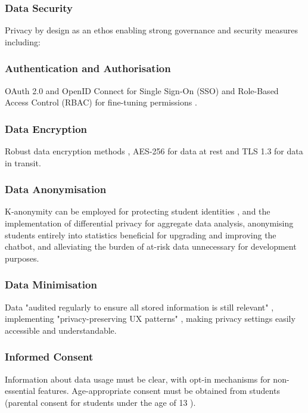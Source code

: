 \documentclass[14pt,a4paper]{article}
\begin{document}
\begin{multicols}{2}
\subsubsection{Data Security}
Privacy by design as an ethos enabling strong governance and security measures including:

\subsubsection*{Authentication and Authorisation}
OAuth 2.0 and OpenID Connect for Single Sign-On (SSO) and Role-Based Access Control (RBAC) for fine-tuning permissions \textit{\parencite[pp. 80-120]{Josuttis2023}}.

\subsubsection*{Data Encryption}
Robust data encryption methods \textit{\parencite[pp. 100-150]{Stallings2023}}, AES-256 for data at rest and TLS 1.3 for data in transit.

\subsubsection{Data Anonymisation}
K-anonymity can be employed for protecting student identities \textit{\parencite[pp. 75-100]{ElEmamArbuckle2023}}, and the implementation of differential privacy for aggregate data analysis, anonymising students entirely into statistics beneficial for upgrading and improving the chatbot, and alleviating the burden of at-risk data unnecessary for development purposes.

\subsubsection{Data Minimisation}
Data "audited regularly to ensure all stored information is still relevant" \textit{\parencite{A29WP2018}}, implementing "privacy-preserving UX patterns" \textit{\parencite[pp. 50-100]{Hartzog2023}}, making privacy settings easily accessible and understandable.

\subsubsection*{Informed Consent}
Information about data usage must be clear, with opt-in mechanisms for non-essential features. Age-appropriate consent must be obtained from students (parental consent for students under the age of 13 \textit{\parencite{FTC2023}}).


\end{multicols}
\end{document}
